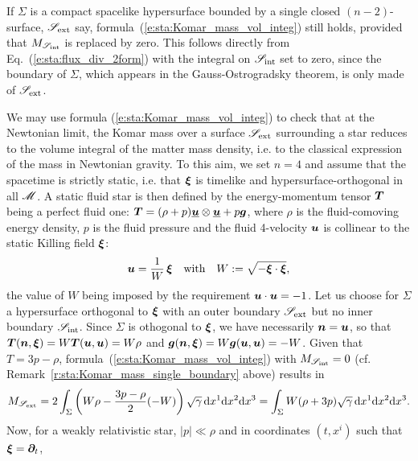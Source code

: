 \begin{remark}
\label{r:sta:Komar_mass_single_boundary}
If $\Sigma$ is a compact spacelike hypersurface bounded by a single closed
$(n-2)$-surface, $\mathscr{S}_{\rm ext}$ say, formula~(\ref{e:sta:Komar_mass_vol_integ})
still holds, provided that $M_{\mathscr{S}_{\rm int}}$ is replaced by zero. This follows
directly from Eq.~(\ref{e:sta:flux_div_2form}) with the integral on $\mathscr{S}_{\rm int}$
set to zero, since the boundary of $\Sigma$, which appears in the
Gauss-Ostrogradsky theorem, is only made of $\mathscr{S}_{\rm ext}$.
\end{remark}

\begin{example}
\label{x:sta:Komar_mass_star}
We may use formula (\ref{e:sta:Komar_mass_vol_integ})
to check that at the Newtonian limit, the Komar mass over
a surface $\mathscr{S}_{\rm ext}$ surrounding a star
reduces to the volume integral of the matter mass density,
i.e. to the classical expression of the mass
in Newtonian gravity.
To this aim, we set $n=4$ and assume that the spacetime is strictly static, i.e. that $\bm{\xi}$
is timelike and hypersurface-orthogonal in all $\mathscr{M}$.
A static fluid star is then
defined by the energy-momentum tensor $\bm{T}$ being
a perfect fluid one:
$\bm{T} = (\rho + p)\underline{\bm{u}} \otimes \underline{\bm{u}} + p \bm{g}$, where
$\rho$ is the fluid-comoving energy density,
$p$ is the fluid pressure and the fluid 4-velocity $\bm{u}$ is collinear to the
static Killing field $\bm{\xi}$:
\[
    \bm{u} = \frac{1}{W} \, \bm{\xi}
    \quad\mbox{with}\quad
    W := \sqrt{- \bm{\xi}\cdot\bm{\xi} } ,
\]
the value of $W$ being imposed by the requirement $\bm{u}\cdot\bm{u} = -1$.
Let us choose for $\Sigma$ a hypersurface orthogonal to $\bm{\xi}$
with an outer boundary  $\mathscr{S}_{\rm ext}$ but no inner boundary $\mathscr{S}_{\rm int}$.
Since $\Sigma$ is othogonal to $\bm{\xi}$, we have
necessarily $\bm{n} = \bm{u}$, so that $\bm{T}(\bm{n},\bm{\xi}) = W \bm{T}(\bm{u},\bm{u})
= W \rho$ and $\bm{g}(\bm{n},\bm{\xi}) = W \bm{g}(\bm{u},\bm{u}) = -W$. Given that
$T = 3 p  - \rho$, formula~(\ref{e:sta:Komar_mass_vol_integ}) with
$M_{\mathscr{S}_{\rm int}} =  0$ (cf. Remark~\ref{r:sta:Komar_mass_single_boundary} above)
results in
\[
    M_{\mathscr{S}_{\rm ext}} = 2
    \int_{\Sigma} \left( W \rho - \frac{3p - \rho}{2}(-W) \right)
    \sqrt{\gamma} \, \mathrm{d} x^1 \mathrm{d} x^2 \mathrm{d} x^3
    = \int_{\Sigma} W (\rho + 3 p) \sqrt{\gamma} \, \mathrm{d} x^1 \mathrm{d} x^2 \mathrm{d} x^3 .
\]
Now, for a weakly relativistic star, $|p| \ll \rho$ and
 in coordinates $(t, x^i)$ such that
$\bm{\xi} = \bm{\partial}_t$,

\end{example}
